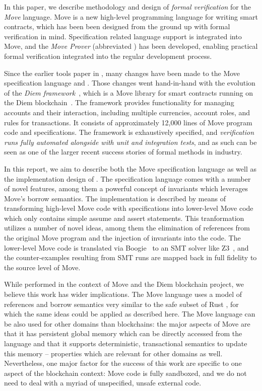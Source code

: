 
In this paper, we describe methodology and design of \emph{formal verification}
for the \emph{Move} language.  Move \cite{MOVE_LANG} is a new high-level
programming language for writing smart contracts, which has been been designed
from the ground up with formal verification in mind. Specification related
language support is integrated into Move, and the \emph{Move Prover}
\cite{MOVE_PROVER} (abbreviated \MVP) has been developed, enabling practical
formal verification integrated into the regular development process.

Since the earlier tools paper in \cite{MOVE_PROVER}, many changes have been made
to the Move specification language and \MVP. Those changes went hand-in-hand
with the evolution of the \emph{Diem framework}~\cite{DIEM_FRAMEWORK}, which is
a Move library for smart contracts running on the Diem
blockchain~\cite{DIEM}. The framework provides functionality for managing
accounts and their interaction, including multiple currencies, account roles,
and rules for transactions.  It consists of approximately 12,000 lines of Move
program code and specifications.  The framework is exhaustively specified, and
\emph{verification runs fully automated alongside with unit and integration
  tests}, and as such can be seen as one of the larger recent success stories of
formal methods in industry.

In this report, we aim to describe both the Move specification language as well
as the implementation design of \MVP. The specification language comes with a
number of novel features, among them a powerful concept of invariants which
leverages Move's borrow semantics. The implementation is described by means of
transforming high-level Move code with specifications into lower-level Move code
which only contains simple assume and assert statements. This tranformation
utilizes a number of novel ideas, among them the elimination of references from
the original Move program and the injection of invariants into the code. The
lower-level Move code is translated via Boogie~\cite{BOOGIE} to an SMT solver
like Z3~\cite{Z3}, and the counter-examples resulting from SMT runs are mapped
back in full fidelity to the source level of Move.

While performed in the context of Move and the Diem blockchain project, we
believe this work has wider implications. The Move language uses a model of
references and borrow semantics very similar to the safe subset of Rust
\cite{RUST}, for which the same ideas could be applied as described here.  The
Move language can be also used for other domains than blockchains: the major
aspects of Move are that it has persistent global memory which can be directly
accessed from the language and that it supports deterministic, transactional
semantics to update this memory -- properties which are relevant for other
domains as well. Nevertheless, one major factor for the success of this work are
specific to one aspect of the blockchain context: Move code is fully sandboxed,
and we do not need to deal with a myriad of unspecified, unsafe external code.

